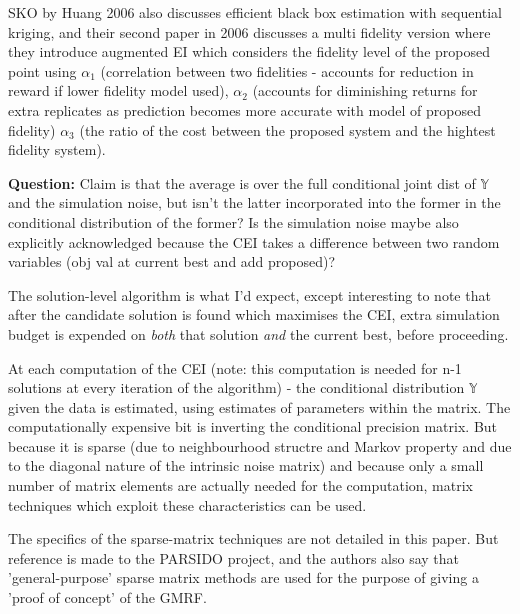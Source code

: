 \documentclass{article}
\begin{document}
SKO by Huang 2006 also discusses efficient black box estimation with sequential kriging, and their second paper in 2006 discusses a multi fidelity version where they introduce augmented EI which considers the fidelity level of the proposed point using $\alpha_1$ (correlation between two fidelities - accounts for reduction in reward if lower fidelity model used), $\alpha_2$ (accounts for diminishing returns for extra replicates as prediction becomes more accurate with model of proposed fidelity) $\alpha_3$ (the ratio of the cost between the proposed system and the hightest fidelity system). \newline

\textbf{Question: } Claim is that the average is over the full conditional joint dist of $\mathbb{Y}$ and the simulation noise, but isn't the latter incorporated into the former in the conditional distribution of the former? Is the simulation noise maybe also explicitly acknowledged because the CEI takes a difference between two random variables (obj val at current best and add proposed)? \newline

The solution-level algorithm is what I'd expect, except interesting to note that after the candidate solution is found which maximises the CEI, extra simulation budget is expended on \emph{both} that solution \emph{and} the current best, before proceeding. \newline

At each computation of the CEI (note: this computation is needed for n-1 solutions at every iteration of the algorithm) - the conditional distribution $\mathbb{Y}$ given the data is estimated, using estimates of parameters within the matrix. The computationally expensive bit is inverting the conditional precision matrix. But because it is sparse (due to neighbourhood structre and Markov property and due to the diagonal nature of the intrinsic noise matrix) and because only a small number of matrix elements are actually needed for the computation, matrix techniques which exploit these characteristics can be used. \newline

The specifics of the sparse-matrix techniques are not detailed in this paper. But reference is made to the PARSIDO project, and the authors also say that 'general-purpose' sparse matrix methods are used for the purpose of giving a 'proof of concept' of the GMRF. \newline
\end{document}
